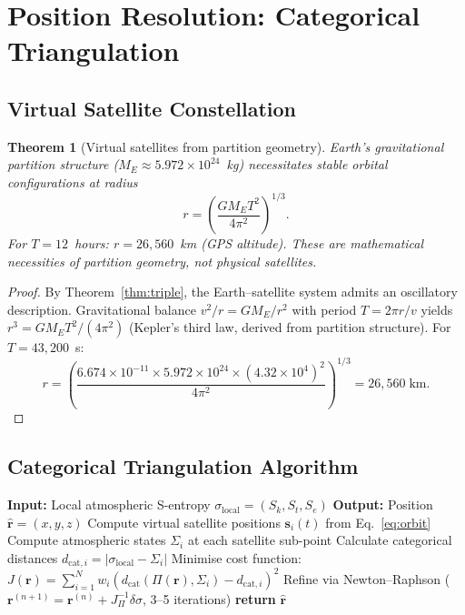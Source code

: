 \documentclass[10pt,twocolumn]{article}
\newtheorem{theorem}{Theorem}[section]
\theoremstyle{definition}
\theoremstyle{remark}
\newcommand{\Sk}{S_k}
\newcommand{\St}{S_t}
\newcommand{\Se}{S_e}
\begin{document}
\section{Position Resolution: Categorical Triangulation}
\label{sec:position}

\subsection{Virtual Satellite Constellation}
\label{sec:virtual_sats}

\begin{theorem}[Virtual satellites from partition geometry]
\label{thm:virtual}
Earth's gravitational partition structure
($M_E\approx 5.972\times 10^{24}$~kg) necessitates stable
orbital configurations at radius
\begin{equation}\label{eq:orbit}
  r = \left(\frac{GM_E T^2}{4\pi^2}\right)^{1/3}.
\end{equation}
For $T=12$~hours: $r=26{,}560$~km (GPS altitude).  These are
mathematical necessities of partition geometry, not physical
satellites.
\end{theorem}

\begin{proof}
By Theorem~\ref{thm:triple}, the Earth--satellite system
admits an oscillatory description.  Gravitational balance
$v^2/r = GM_E/r^2$ with period $T=2\pi r/v$ yields
$r^3=GM_E T^2/(4\pi^2)$ (Kepler's third law, derived from
partition structure).  For $T=43{,}200$~s:
\begin{equation}
  r = \left(\frac{6.674\times 10^{-11}\times
    5.972\times 10^{24}\times (4.32\times 10^4)^2}
    {4\pi^2}\right)^{1/3}
  = 26{,}560\;\mathrm{km}.
\end{equation}
\end{proof}

\subsection{Categorical Triangulation Algorithm}
\label{sec:triangulation}

\begin{algorithm}[H]
\caption{Position from S-Entropy}
\label{alg:position}
\begin{algorithmic}[1]
\STATE \textbf{Input:} Local atmospheric S-entropy
  $\sigma_{\mathrm{local}}=(\Sk,\St,\Se)$
\STATE \textbf{Output:} Position
  $\hat{\mathbf{r}}=(x,y,z)$
\STATE Compute virtual satellite positions
  $\mathbf{s}_i(t)$ from Eq.~\eqref{eq:orbit}
\STATE Compute atmospheric states $\Sigma_i$ at each
  satellite sub-point
\STATE Calculate categorical distances
  $d_{\mathrm{cat},i}=|\sigma_{\mathrm{local}}-\Sigma_i|$
\STATE Minimise cost function:
  $J(\mathbf{r})=\sum_{i=1}^{N}w_i
  (d_{\mathrm{cat}}(\Pi(\mathbf{r}),\Sigma_i)
  -d_{\mathrm{cat},i})^2$
\STATE Refine via Newton--Raphson
  ($\mathbf{r}^{(n+1)}=\mathbf{r}^{(n)}+
  J_\Pi^{-1}\delta\sigma$, 3--5 iterations)
\STATE \textbf{return} $\hat{\mathbf{r}}$
\end{algorithmic}
\end{algorithm}
\end{document}

